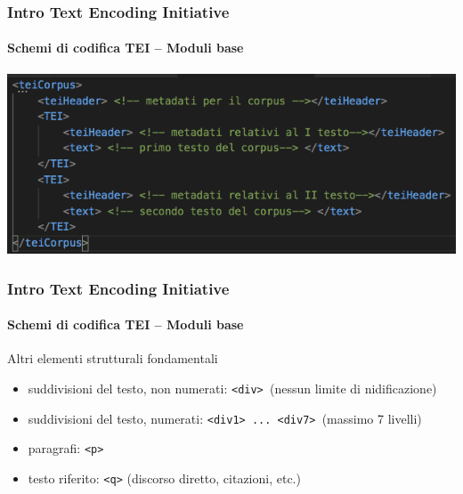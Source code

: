 \begin{frame}
	\frametitle{Intro Text Encoding Initiative}
	\framesubtitle{Schemi di codifica TEI – Moduli base}
	\addtocounter{nframe}{1}
	\begin{center}
		\includegraphics[width=.95\textwidth]{imgs/composito2.png}
	\end{center}

\end{frame}





\begin{frame}
	\frametitle{Intro Text Encoding Initiative}
	\framesubtitle{Schemi di codifica TEI – Moduli base}
	\addtocounter{nframe}{1}

	\begin{block}{Altri elementi strutturali fondamentali}
        \begin{itemize}
            \item suddivisioni del testo, non numerati: \texttt{<div> }(nessun limite di nidificazione)
            \item suddivisioni del testo, numerati: \texttt{<div1> ... <div7> }(massimo 7 livelli)
            \item paragrafi: \texttt{<p>}
            \item testo riferito: \texttt{<q>} (discorso diretto, citazioni, etc.)
        \end{itemize}
        
    \end{block}
\end{frame}


